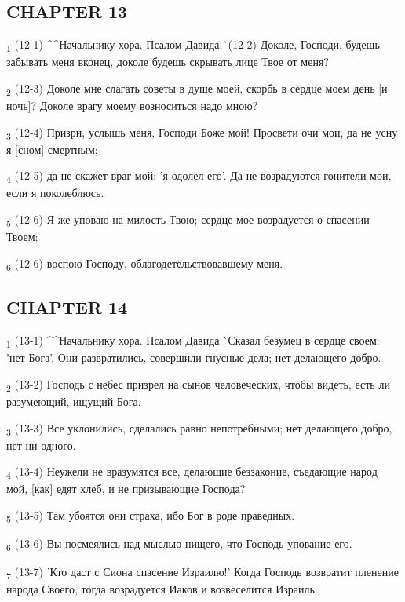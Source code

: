 \subsection{CHAPTER 13}
\begin{tcolorbox}
\textsubscript{1} (12-1) ^^Начальнику хора. Псалом Давида.^^ (12-2) Доколе, Господи, будешь забывать меня вконец, доколе будешь скрывать лице Твое от меня?
\end{tcolorbox}
\begin{tcolorbox}
\textsubscript{2} (12-3) Доколе мне слагать советы в душе моей, скорбь в сердце моем день [и ночь]? Доколе врагу моему возноситься надо мною?
\end{tcolorbox}
\begin{tcolorbox}
\textsubscript{3} (12-4) Призри, услышь меня, Господи Боже мой! Просвети очи мои, да не усну я [сном] смертным;
\end{tcolorbox}
\begin{tcolorbox}
\textsubscript{4} (12-5) да не скажет враг мой: 'я одолел его'. Да не возрадуются гонители мои, если я поколеблюсь.
\end{tcolorbox}
\begin{tcolorbox}
\textsubscript{5} (12-6) Я же уповаю на милость Твою; сердце мое возрадуется о спасении Твоем;
\end{tcolorbox}
\begin{tcolorbox}
\textsubscript{6} (12-6) воспою Господу, облагодетельствовавшему меня.
\end{tcolorbox}
\subsection{CHAPTER 14}
\begin{tcolorbox}
\textsubscript{1} (13-1) ^^Начальнику хора. Псалом Давида.^^ Сказал безумец в сердце своем: 'нет Бога'. Они развратились, совершили гнусные дела; нет делающего добро.
\end{tcolorbox}
\begin{tcolorbox}
\textsubscript{2} (13-2) Господь с небес призрел на сынов человеческих, чтобы видеть, есть ли разумеющий, ищущий Бога.
\end{tcolorbox}
\begin{tcolorbox}
\textsubscript{3} (13-3) Все уклонились, сделались равно непотребными; нет делающего добро, нет ни одного.
\end{tcolorbox}
\begin{tcolorbox}
\textsubscript{4} (13-4) Неужели не вразумятся все, делающие беззаконие, съедающие народ мой, [как] едят хлеб, и не призывающие Господа?
\end{tcolorbox}
\begin{tcolorbox}
\textsubscript{5} (13-5) Там убоятся они страха, ибо Бог в роде праведных.
\end{tcolorbox}
\begin{tcolorbox}
\textsubscript{6} (13-6) Вы посмеялись над мыслью нищего, что Господь упование его.
\end{tcolorbox}
\begin{tcolorbox}
\textsubscript{7} (13-7) 'Кто даст с Сиона спасение Израилю!' Когда Господь возвратит пленение народа Своего, тогда возрадуется Иаков и возвеселится Израиль.
\end{tcolorbox}
